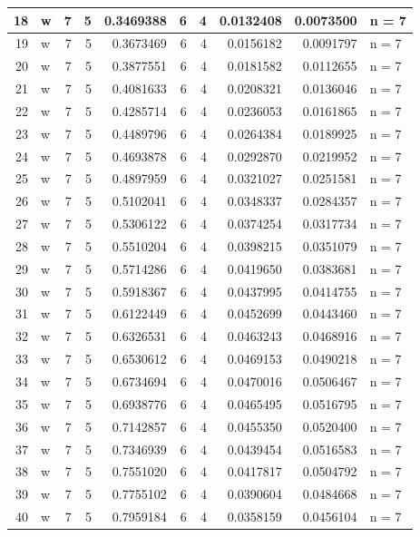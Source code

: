 \documentclass[
  letterpaper,
  DIV=11,
  numbers=noendperiod]{scrreprt}
\begin{document}
\begin{table}
\begin{tabular}[t]{r|l|r|r|r|r|r|r|r|l}
\hline
18 & w & 7 & 5 & 0.3469388 & 6 & 4 & 0.0132408 & 0.0073500 & n = 7\\
\hline
19 & w & 7 & 5 & 0.3673469 & 6 & 4 & 0.0156182 & 0.0091797 & n = 7\\
\hline
20 & w & 7 & 5 & 0.3877551 & 6 & 4 & 0.0181582 & 0.0112655 & n = 7\\
\hline
21 & w & 7 & 5 & 0.4081633 & 6 & 4 & 0.0208321 & 0.0136046 & n = 7\\
\hline
22 & w & 7 & 5 & 0.4285714 & 6 & 4 & 0.0236053 & 0.0161865 & n = 7\\
\hline
23 & w & 7 & 5 & 0.4489796 & 6 & 4 & 0.0264384 & 0.0189925 & n = 7\\
\hline
24 & w & 7 & 5 & 0.4693878 & 6 & 4 & 0.0292870 & 0.0219952 & n = 7\\
\hline
25 & w & 7 & 5 & 0.4897959 & 6 & 4 & 0.0321027 & 0.0251581 & n = 7\\
\hline
26 & w & 7 & 5 & 0.5102041 & 6 & 4 & 0.0348337 & 0.0284357 & n = 7\\
\hline
27 & w & 7 & 5 & 0.5306122 & 6 & 4 & 0.0374254 & 0.0317734 & n = 7\\
\hline
28 & w & 7 & 5 & 0.5510204 & 6 & 4 & 0.0398215 & 0.0351079 & n = 7\\
\hline
29 & w & 7 & 5 & 0.5714286 & 6 & 4 & 0.0419650 & 0.0383681 & n = 7\\
\hline
30 & w & 7 & 5 & 0.5918367 & 6 & 4 & 0.0437995 & 0.0414755 & n = 7\\
\hline
31 & w & 7 & 5 & 0.6122449 & 6 & 4 & 0.0452699 & 0.0443460 & n = 7\\
\hline
32 & w & 7 & 5 & 0.6326531 & 6 & 4 & 0.0463243 & 0.0468916 & n = 7\\
\hline
33 & w & 7 & 5 & 0.6530612 & 6 & 4 & 0.0469153 & 0.0490218 & n = 7\\
\hline
34 & w & 7 & 5 & 0.6734694 & 6 & 4 & 0.0470016 & 0.0506467 & n = 7\\
\hline
35 & w & 7 & 5 & 0.6938776 & 6 & 4 & 0.0465495 & 0.0516795 & n = 7\\
\hline
36 & w & 7 & 5 & 0.7142857 & 6 & 4 & 0.0455350 & 0.0520400 & n = 7\\
\hline
37 & w & 7 & 5 & 0.7346939 & 6 & 4 & 0.0439454 & 0.0516583 & n = 7\\
\hline
38 & w & 7 & 5 & 0.7551020 & 6 & 4 & 0.0417817 & 0.0504792 & n = 7\\
\hline
39 & w & 7 & 5 & 0.7755102 & 6 & 4 & 0.0390604 & 0.0484668 & n = 7\\
\hline
40 & w & 7 & 5 & 0.7959184 & 6 & 4 & 0.0358159 & 0.0456104 & n = 7\\

\end{tabular}
\end{table}
\end{document}
